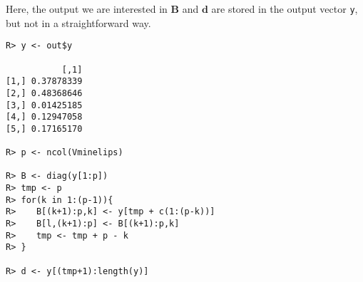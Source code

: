 \documentclass{article}
\newcommand{\ve}[1]{\mathbf{#1}}           %
\newcommand{\m}[1]{\mathbf{#1}}               %
\begin{document}
Here, the output we are interested in $\m{B}$ and $\ve{d}$ are stored in the output vector \verb!y!, but not in a straightforward way. 

\begin{verbatim}
R> y <- out$y

           [,1]
[1,] 0.37878339
[2,] 0.48368646
[3,] 0.01425185
[4,] 0.12947058
[5,] 0.17165170

R> p <- ncol(Vminelips)

R> B <- diag(y[1:p])
R> tmp <- p
R> for(k in 1:(p-1)){
R>    B[(k+1):p,k] <- y[tmp + c(1:(p-k))]
R>    B[l,(k+1):p] <- B[(k+1):p,k]
R>    tmp <- tmp + p - k
R> }

R> d <- y[(tmp+1):length(y)]
\end{verbatim}



\end{document}
